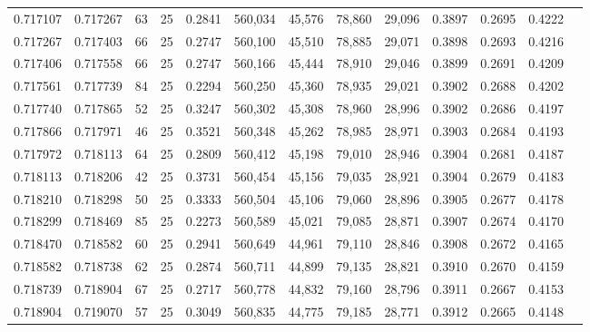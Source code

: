 \begin{tabular}{rrrrrrrrrrrrr}
0.717107 & 0.717267 &    63 &  25 &                                     0.2841 & 560,034 &  45,576 &  78,860 &  29,096 & 0.3897 & 0.2695 & 0.4222 \\
0.717267 & 0.717403 &    66 &  25 &                                     0.2747 & 560,100 &  45,510 &  78,885 &  29,071 & 0.3898 & 0.2693 & 0.4216 \\
0.717406 & 0.717558 &    66 &  25 &                                     0.2747 & 560,166 &  45,444 &  78,910 &  29,046 & 0.3899 & 0.2691 & 0.4209 \\
0.717561 & 0.717739 &    84 &  25 &                                     0.2294 & 560,250 &  45,360 &  78,935 &  29,021 & 0.3902 & 0.2688 & 0.4202 \\
0.717740 & 0.717865 &    52 &  25 &                                     0.3247 & 560,302 &  45,308 &  78,960 &  28,996 & 0.3902 & 0.2686 & 0.4197 \\
0.717866 & 0.717971 &    46 &  25 &                                     0.3521 & 560,348 &  45,262 &  78,985 &  28,971 & 0.3903 & 0.2684 & 0.4193 \\
0.717972 & 0.718113 &    64 &  25 &                                     0.2809 & 560,412 &  45,198 &  79,010 &  28,946 & 0.3904 & 0.2681 & 0.4187 \\
0.718113 & 0.718206 &    42 &  25 &                                     0.3731 & 560,454 &  45,156 &  79,035 &  28,921 & 0.3904 & 0.2679 & 0.4183 \\
0.718210 & 0.718298 &    50 &  25 &                                     0.3333 & 560,504 &  45,106 &  79,060 &  28,896 & 0.3905 & 0.2677 & 0.4178 \\
0.718299 & 0.718469 &    85 &  25 &                                     0.2273 & 560,589 &  45,021 &  79,085 &  28,871 & 0.3907 & 0.2674 & 0.4170 \\
0.718470 & 0.718582 &    60 &  25 &                                     0.2941 & 560,649 &  44,961 &  79,110 &  28,846 & 0.3908 & 0.2672 & 0.4165 \\
0.718582 & 0.718738 &    62 &  25 &                                     0.2874 & 560,711 &  44,899 &  79,135 &  28,821 & 0.3910 & 0.2670 & 0.4159 \\
0.718739 & 0.718904 &    67 &  25 &                                     0.2717 & 560,778 &  44,832 &  79,160 &  28,796 & 0.3911 & 0.2667 & 0.4153 \\
0.718904 & 0.719070 &    57 &  25 &                                     0.3049 & 560,835 &  44,775 &  79,185 &  28,771 & 0.3912 & 0.2665 & 0.4148 \\

\end{tabular}
